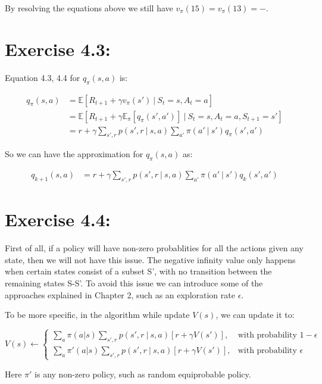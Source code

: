 \documentclass[10pt,letterpaper]{article}
\newcommand\given[1][]{\:#1\vert\:}
\begin{document}
By resolving the equations above we still have $v_\pi(15) = v_\pi(13) = -$.

\section*{Exercise 4.3: }
\label{4.3}

Equation 4.3, 4.4 for $q_\pi(s,a)$ is:

\begin{align}
q_\pi(s,a) &= \mathbb{E}[R_{t+1} + \gamma v_\pi(s') \given S_t=s, A_t=a]\\
&= \mathbb{E}[R_{t+1} + \gamma \mathbb{E}_\pi[q_\pi(s',a')] \given S_t=s, A_t=a, S_{t+1} = s']\\ 
&= r + \gamma\sum_{s',r}p(s',r\given s,a)\sum_{a'}\pi(a'\given s')q_\pi(s', a')
\end{align}

So we can have the approximation for $q_\pi(s,a)$ as:

\begin{align}
q_{k+1}(s,a) &= r + \gamma\sum_{s',r}p(s',r\given s,a)\sum_{a'}\pi(a'\given s')q_{k}(s', a')
\end{align}


\section*{Exercise 4.4: }
\label{4.4}

First of all, if a policy will have non-zero probablities for all the actions given any state, then we will not have this issue. The negative infinity value only happens when certain states consist of a subset S', with no transition between the remaining states S-S'. To avoid this issue we can introduce some of the approaches explained in Chapter 2, such as an exploration rate $\epsilon$.

To be more specific, in the algorithm while update $V(s)$, we can update it to:

\begin{center}
\[V(s) \leftarrow \begin{cases}
\sum_a\pi(a|s)\sum_{s',r}p(s',r\given s,a)[r+\gamma V(s')], & \text{with probability } 1-\epsilon \\
\sum_a\pi'(a|s)\sum_{s',r}p(s',r\given s,a)[r+\gamma V(s')], & \text{with probability } \epsilon
\end{cases}
\]
\end{center}

Here $\pi'$ is any non-zero policy, such as random equiprobable policy.
\end{document}
